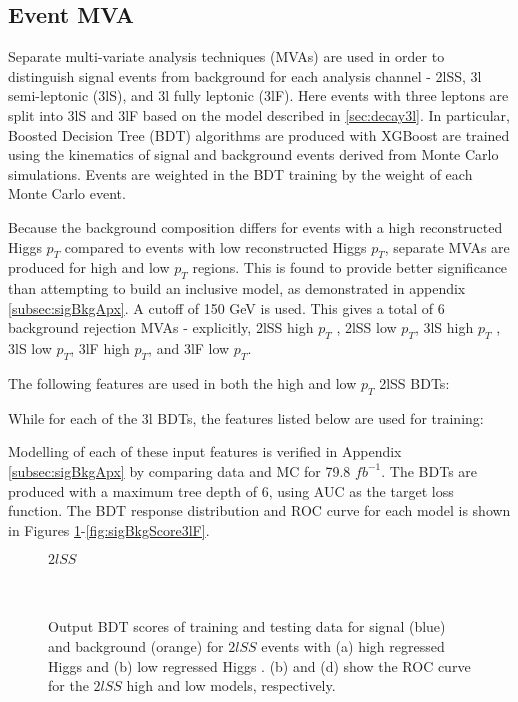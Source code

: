 
\subsection{Event MVA}
\label{subsec:sigBkgMVA}

Separate multi-variate analysis techniques (MVAs) are used in order to distinguish signal events from background for each analysis channel - 2lSS, 3l semi-leptonic (3lS), and 3l fully leptonic (3lF). Here events with three leptons are split into 3lS and 3lF based on the model described in \ref{sec:decay3l}. In particular, Boosted Decision Tree (BDT) algorithms are produced with XGBoost \cite{xgboost} are trained using the kinematics of signal and background events derived from Monte Carlo simulations. Events are weighted in the BDT training by the weight of each Monte Carlo event. 

Because the background composition differs for events with a high reconstructed Higgs $p_T$ compared to events with low reconstructed Higgs $p_T$, separate MVAs are produced for high and low $p_T$ regions. This is found to provide better significance than attempting to build an inclusive model, as demonstrated in appendix \ref{subsec:sigBkgApx}. A cutoff of 150 GeV is used. This gives a total of 6 background rejection MVAs - explicitly, 2lSS high $p_T$ , 2lSS low $p_T$, 3lS high $p_T$ , 3lS low $p_T$, 3lF high $p_T$, and 3lF low $p_T$.

The following features are used in both the high and low $p_T$ 2lSS BDTs:



While for each of the 3l BDTs, the features listed below are used for training:



Modelling of each of these input features is verified in Appendix \ref{subsec:sigBkgApx} by comparing data and MC for 79.8 $fb^{-1}$. The BDTs are produced with a maximum tree depth of 6, using AUC as the target loss function. The BDT response distribution and ROC curve for each model is shown in Figures \ref{fig:sigBkgScore2lSS}-\ref{fig:sigBkgScore3lF}.

\begin{figure}[H]
  \centering
  \textbf{$2lSS$}\\
  \\
  \\ 
  \caption{Output BDT scores of training and testing data for signal (blue) and background (orange) for $2lSS$ events with (a) high regressed Higgs \pt and (b) low regressed Higgs \pt. (b) and (d) show the ROC curve for the $2lSS$ high and low \pt models, respectively.}
  \label{fig:sigBkgScore2lSS}
\end{figure}

